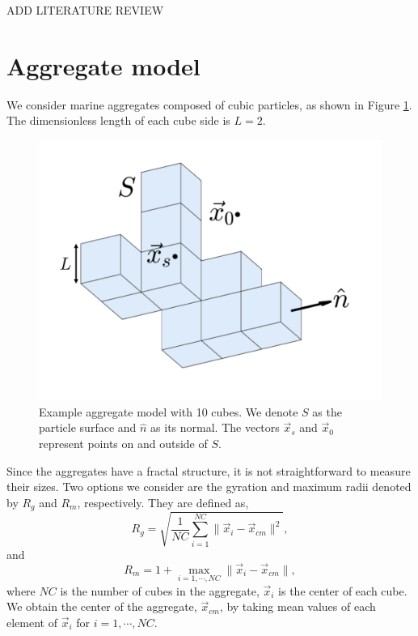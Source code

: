 {\color{blue}ADD LITERATURE REVIEW}

\section{Aggregate model}
We consider marine aggregates composed of cubic particles, as shown in Figure \ref{fig_cube10}. The dimensionless length of each cube side is $L=2$.
\begin{figure}[ht]
	\begin{center}
		\includegraphics[scale=0.25]{figures/fig_cube10_CC.pdf}
	\end{center}
	\caption{Example aggregate model with 10 cubes. We denote $S$ as the particle surface and $\hat{n}$ as its normal. The vectors $\vec{x}_s$ and $\vec{x}_0$ represent points on and outside of $S$. }
	\label{fig_cube10}
\end{figure}
Since the aggregates have a fractal structure, it is not straightforward to measure their sizes. Two options we consider are the gyration and maximum radii denoted by $R_g$ and $R_m$, respectively. They are defined as,
\begin{equation}
R_g  = \sqrt{\frac{1}{NC} \sum_{i=1}^{NC} \| \vec{x}_i - \vec{x}_{cm} \|^2},
\label{eq_Rg}
\end{equation}
and
\begin{equation}
R_m = 1+ \max_{i = 1, \cdots, NC} \| \vec{x}_i - \vec{x}_{cm} \|,
\label{eq_Rm}
\end{equation}
where $NC$ is the number of cubes in the aggregate, $\vec{x}_i$ is the center of each cube.
We obtain the center of the aggregate, $\vec{x}_{cm}$, by taking mean values of each element of $\vec{x}_i$ for $i = 1, \cdots, NC$.
